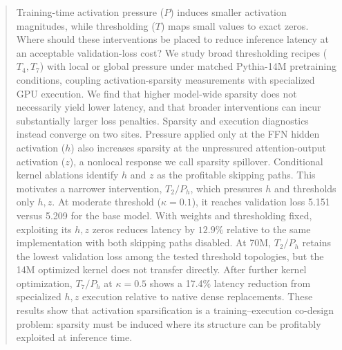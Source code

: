 \begin{abstract}
Training-time activation pressure ($P$) induces smaller activation magnitudes, while thresholding ($T$) maps small values to exact zeros. Where should these interventions be placed to reduce inference latency at an acceptable validation-loss cost? We study broad thresholding recipes ($T_4,T_7$) with local or global pressure under matched Pythia-14M pretraining conditions, coupling activation-sparsity measurements with specialized GPU execution. We find that higher model-wide sparsity does not necessarily yield lower latency, and that broader interventions can incur substantially larger loss penalties. Sparsity and execution diagnostics instead converge on two sites. Pressure applied only at the FFN hidden activation ($h$) also increases sparsity at the unpressured attention-output activation ($z$), a nonlocal response we call sparsity spillover. Conditional kernel ablations identify $h$ and $z$ as the profitable skipping paths. This motivates a narrower intervention, $T_2/P_h$, which pressures $h$ and thresholds only $h,z$. At moderate threshold ($\kappa=0.1$), it reaches validation loss 5.151 versus 5.209 for the base model. With weights and thresholding fixed, exploiting its $h,z$ zeros reduces latency by $12.9\%$ relative to the same implementation with both skipping paths disabled. At 70M, $T_2/P_h$ retains the lowest validation loss among the tested threshold topologies, but the 14M optimized kernel does not transfer directly. After further kernel optimization, $T_7/P_h$ at $\kappa=0.5$ shows a 17.4\% latency reduction from specialized $h,z$ execution relative to native dense replacements. These results show that activation sparsification is a training--execution co-design problem: sparsity must be induced where its structure can be profitably exploited at inference time.
\end{abstract}
